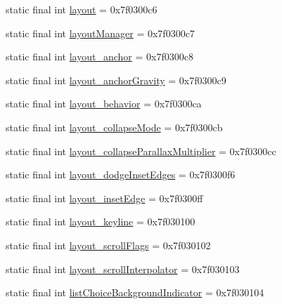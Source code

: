\begin{DoxyCompactItemize}
static final int \mbox{\hyperlink{classandroid_1_1support_1_1design_1_1_r_1_1attr_a3aaf263ae2389f59b449db18688458be}{layout}} = 0x7f0300c6
\item 
static final int \mbox{\hyperlink{classandroid_1_1support_1_1design_1_1_r_1_1attr_a3ae726ff9deb4f56dd1d6f42ca5cea7d}{layout\+Manager}} = 0x7f0300c7
\item 
static final int \mbox{\hyperlink{classandroid_1_1support_1_1design_1_1_r_1_1attr_a3e21ef336487fd263dc6e15b8fe3e6dd}{layout\+\_\+anchor}} = 0x7f0300c8
\item 
static final int \mbox{\hyperlink{classandroid_1_1support_1_1design_1_1_r_1_1attr_a03a22adfa172713854cd688456978661}{layout\+\_\+anchor\+Gravity}} = 0x7f0300c9
\item 
static final int \mbox{\hyperlink{classandroid_1_1support_1_1design_1_1_r_1_1attr_aa690424f72fdba65a975e5e812780c53}{layout\+\_\+behavior}} = 0x7f0300ca
\item 
static final int \mbox{\hyperlink{classandroid_1_1support_1_1design_1_1_r_1_1attr_a73918d086000ebb3ad8010659a217a0d}{layout\+\_\+collapse\+Mode}} = 0x7f0300cb
\item 
static final int \mbox{\hyperlink{classandroid_1_1support_1_1design_1_1_r_1_1attr_ab2173014ba4a8ee69f0e09827602f535}{layout\+\_\+collapse\+Parallax\+Multiplier}} = 0x7f0300cc
\item 
static final int \mbox{\hyperlink{classandroid_1_1support_1_1design_1_1_r_1_1attr_a0da4c563fe3062f6f8b731a31e469f08}{layout\+\_\+dodge\+Inset\+Edges}} = 0x7f0300f6
\item 
static final int \mbox{\hyperlink{classandroid_1_1support_1_1design_1_1_r_1_1attr_a66add14821aecea89fa64da89bb33e2c}{layout\+\_\+inset\+Edge}} = 0x7f0300ff
\item 
static final int \mbox{\hyperlink{classandroid_1_1support_1_1design_1_1_r_1_1attr_ae22d5ebf8c270969d1d114b91f10a685}{layout\+\_\+keyline}} = 0x7f030100
\item 
static final int \mbox{\hyperlink{classandroid_1_1support_1_1design_1_1_r_1_1attr_abf06a4d322c60012a8612e711555e8c3}{layout\+\_\+scroll\+Flags}} = 0x7f030102
\item 
static final int \mbox{\hyperlink{classandroid_1_1support_1_1design_1_1_r_1_1attr_a85a03bcc3fcfea96ee5bb83a61c79132}{layout\+\_\+scroll\+Interpolator}} = 0x7f030103
\item 
static final int \mbox{\hyperlink{classandroid_1_1support_1_1design_1_1_r_1_1attr_a303695f1026550d65c52a23561edb55c}{list\+Choice\+Background\+Indicator}} = 0x7f030104

\end{DoxyCompactItemize}
